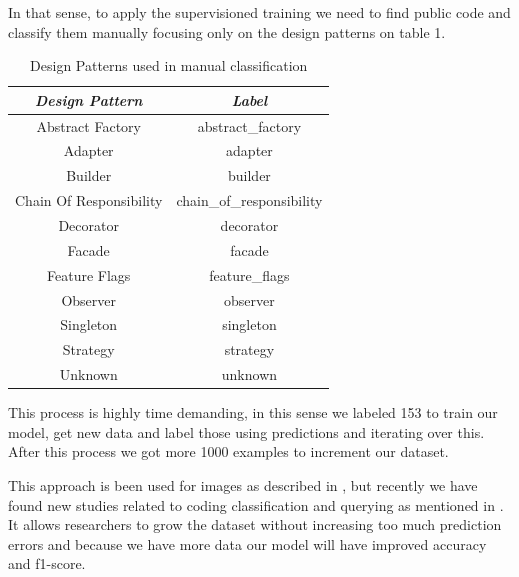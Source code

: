 \documentclass[conference]{IEEEtran}
\begin{document}
In that sense, to apply the supervisioned training we need to find public code and classify them manually focusing only on the design patterns on table 1.

\begin{table}[htbp]
    \caption{Design Patterns used in manual classification}
    \begin{center}
        \begin{tabular}{|c|c|}
            \hline
            \textbf\textbf{\textit{Design Pattern}}& \textbf{\textit{Label}} \\
            \hline 
            Abstract Factory & abstract\_factory \\
            \hline 
            Adapter & adapter \\
            \hline 
            Builder & builder \\
            \hline 
            Chain Of Responsibility & chain\_of\_responsibility \\
            \hline
            Decorator & decorator  \\
            \hline
            Facade & facade  \\
            \hline
            Feature Flags & feature\_flags \\
            \hline
            Observer & observer  \\
            \hline
            Singleton & singleton  \\
            \hline
            Strategy & strategy  \\
            \hline
            Unknown & unknown  \\
            \hline
        \end{tabular}
        \label{tab1}
    \end{center}
\end{table}

This process is highly time demanding, in this sense we labeled 153 to train our model, get new data and label those using predictions and iterating over this.
After this process we got more 1000 examples to increment our dataset.

This approach is been used for images as described in \cite{5291929}, but recently we have found new studies related to coding classification and querying as mentioned in \cite{9689884}. 
It allows researchers to grow the dataset without increasing too much prediction errors and because we have more data our model will have improved accuracy and f1-score.
\end{document}
